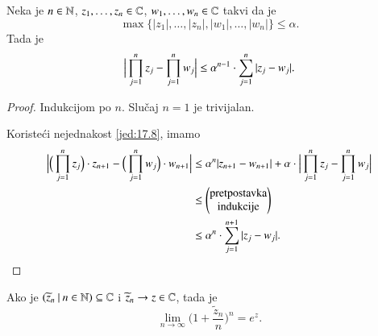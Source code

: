 \begin{lm}  \label{lm:17.9}
    Neka je $n \in \mathbb{N}$, $z_1, \ldots, z_n \in \mathbb{C}$, $w_1, \ldots, w_n \in \mathbb{C}$ takvi da je
    \begin{equation*}
        \max \big\{ |z_1|, \ldots, |z_n|, |w_1|, \ldots, |w_n| \big\} \leq \alpha.
    \end{equation*}
    Tada je
    \begin{equation*}
        \Big| \prod\limits_{j = 1}^{n} z_j - \prod\limits_{j = 1}^{n} w_j \Big| \leq \alpha^{n - 1} \cdot \sum\limits_{j = 1}^{n} |z_j - w_j|.
    \end{equation*}
\end{lm}

\begin{proof}
    Indukcijom po $n$.
    Slu\v caj $n = 1$ je trivijalan.
    
    Koriste\' ci nejednakost \eqref{jed:17.8}, imamo
    \begin{equation*}
        \begin{aligned}
            \Big| \Big( \prod\limits_{j = 1}^{n} z_j \Big) \cdot z_{n + 1} - \Big( \prod\limits_{j = 1}^{n} w_j \Big) \cdot w_{n + 1} \Big| &\leq \alpha^n | z_{n+1} - w_{n+1} | + \alpha \cdot \Big|  \prod\limits_{j = 1}^{n} z_j - \prod\limits_{j = 1}^{n} w_j \Big|\\
            &\leq
            \begin{pmatrix}
                \textnormal{pretpostavka}\\
                \textnormal{indukcije}
            \end{pmatrix}\\
            &\leq \alpha^n \cdot \sum\limits_{j = 1}^{n + 1} |z_j - w_j|.
        \end{aligned}
    \end{equation*}
\end{proof}

\begin{lm}  \label{lm:17.10}
    Ako je $({\widetilde{z}_n} \: | \: {n \in \mathbb{N}}) \subseteq \mathbb{C}$ i $\widetilde{z}_n \to z \in \mathbb{C}$, tada je
    \begin{equation*}
        \lim\limits_{n \to \infty} \Big( 1 + \frac{\widetilde{z}_n}{n} \Big)^n = e^z.
    \end{equation*}
\end{lm}

